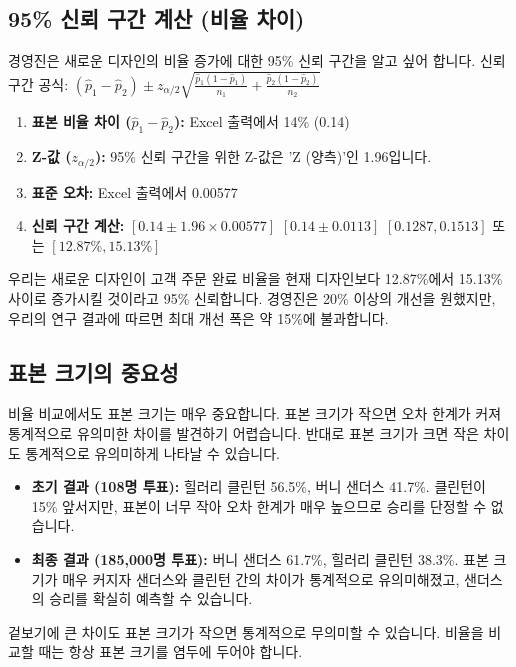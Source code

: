 \documentclass[11pt,a4paper]{book}
\theoremstyle{definition}
\begin{document}
\subsection{95\% 신뢰 구간 계산 (비율 차이)}
경영진은 새로운 디자인의 비율 증가에 대한 95\% 신뢰 구간을 알고 싶어 합니다.
신뢰 구간 공식: $(\hat{p}_1 - \hat{p}_2) \pm z_{\alpha/2} \sqrt{\frac{\hat{p}_1(1-\hat{p}_1)}{n_1} + \frac{\hat{p}_2(1-\hat{p}_2)}{n_2}}$

\begin{enumerate}
    \item \textbf{표본 비율 차이 ($\hat{p}_1 - \hat{p}_2$):}
    Excel 출력에서 14\% (0.14)
    \item \textbf{Z-값 ($z_{\alpha/2}$):}
    95\% 신뢰 구간을 위한 Z-값은 'Z (양측)'인 1.96입니다.
    \item \textbf{표준 오차:}
    Excel 출력에서 0.00577
    \item \textbf{신뢰 구간 계산:}
    $[0.14 \pm 1.96 \times 0.00577]$
    $[0.14 \pm 0.0113]$
    $[0.1287, 0.1513]$ 또는 $[12.87\%, 15.13\%]$
\end{enumerate}

\begin{summarybox}[title=95\% 신뢰 구간 해석]
우리는 새로운 디자인이 고객 주문 완료 비율을 현재 디자인보다 12.87\%에서 15.13\% 사이로 증가시킬 것이라고 95\% 신뢰합니다. 경영진은 20\% 이상의 개선을 원했지만, 우리의 연구 결과에 따르면 최대 개선 폭은 약 15\%에 불과합니다.
\end{summarybox}

\subsection{표본 크기의 중요성}
비율 비교에서도 표본 크기는 매우 중요합니다. 표본 크기가 작으면 오차 한계가 커져 통계적으로 유의미한 차이를 발견하기 어렵습니다. 반대로 표본 크기가 크면 작은 차이도 통계적으로 유의미하게 나타날 수 있습니다.

\begin{examplebox}[title=정치 여론조사 사례:]
\begin{itemize}
    \item \textbf{초기 결과 (108명 투표):} 힐러리 클린턴 56.5\%, 버니 샌더스 41.7\%. 클린턴이 15\% 앞서지만, 표본이 너무 작아 오차 한계가 매우 높으므로 승리를 단정할 수 없습니다.
    \item \textbf{최종 결과 (185,000명 투표):} 버니 샌더스 61.7\%, 힐러리 클린턴 38.3\%. 표본 크기가 매우 커지자 샌더스와 클린턴 간의 차이가 통계적으로 유의미해졌고, 샌더스의 승리를 확실히 예측할 수 있습니다.
\end{itemize}
겉보기에 큰 차이도 표본 크기가 작으면 통계적으로 무의미할 수 있습니다. 비율을 비교할 때는 항상 표본 크기를 염두에 두어야 합니다.
\end{examplebox}
\end{document}
